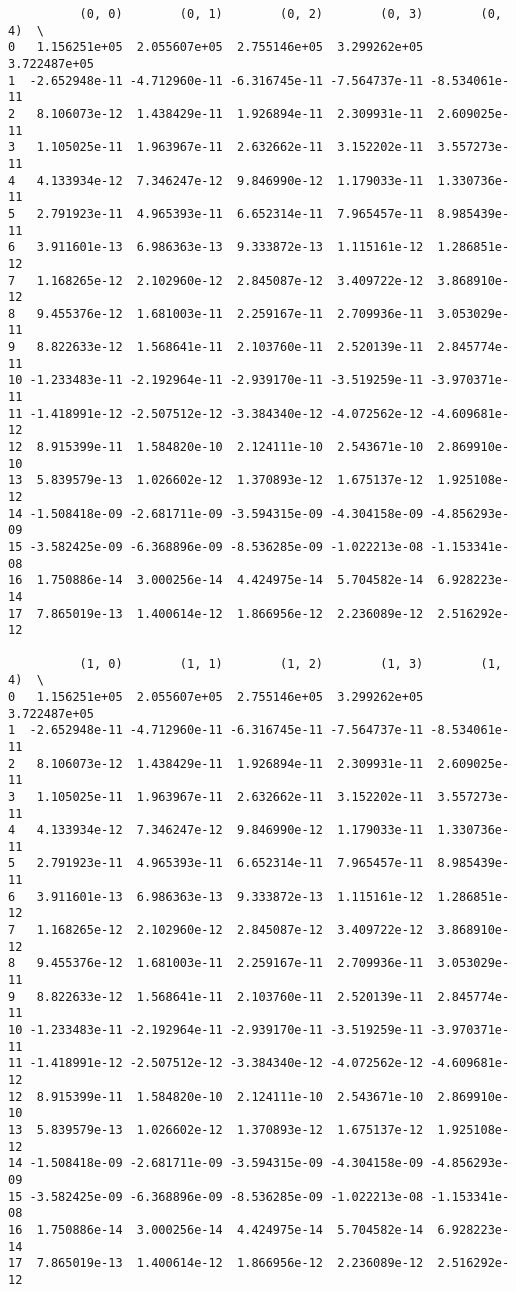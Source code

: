 \documentclass[11pt]{article}
\begin{document}
    
    \begin{verbatim}
          (0, 0)        (0, 1)        (0, 2)        (0, 3)        (0, 4)  \
0   1.156251e+05  2.055607e+05  2.755146e+05  3.299262e+05  3.722487e+05   
1  -2.652948e-11 -4.712960e-11 -6.316745e-11 -7.564737e-11 -8.534061e-11   
2   8.106073e-12  1.438429e-11  1.926894e-11  2.309931e-11  2.609025e-11   
3   1.105025e-11  1.963967e-11  2.632662e-11  3.152202e-11  3.557273e-11   
4   4.133934e-12  7.346247e-12  9.846990e-12  1.179033e-11  1.330736e-11   
5   2.791923e-11  4.965393e-11  6.652314e-11  7.965457e-11  8.985439e-11   
6   3.911601e-13  6.986363e-13  9.333872e-13  1.115161e-12  1.286851e-12   
7   1.168265e-12  2.102960e-12  2.845087e-12  3.409722e-12  3.868910e-12   
8   9.455376e-12  1.681003e-11  2.259167e-11  2.709936e-11  3.053029e-11   
9   8.822633e-12  1.568641e-11  2.103760e-11  2.520139e-11  2.845774e-11   
10 -1.233483e-11 -2.192964e-11 -2.939170e-11 -3.519259e-11 -3.970371e-11   
11 -1.418991e-12 -2.507512e-12 -3.384340e-12 -4.072562e-12 -4.609681e-12   
12  8.915399e-11  1.584820e-10  2.124111e-10  2.543671e-10  2.869910e-10   
13  5.839579e-13  1.026602e-12  1.370893e-12  1.675137e-12  1.925108e-12   
14 -1.508418e-09 -2.681711e-09 -3.594315e-09 -4.304158e-09 -4.856293e-09   
15 -3.582425e-09 -6.368896e-09 -8.536285e-09 -1.022213e-08 -1.153341e-08   
16  1.750886e-14  3.000256e-14  4.424975e-14  5.704582e-14  6.928223e-14   
17  7.865019e-13  1.400614e-12  1.866956e-12  2.236089e-12  2.516292e-12   

          (1, 0)        (1, 1)        (1, 2)        (1, 3)        (1, 4)  \
0   1.156251e+05  2.055607e+05  2.755146e+05  3.299262e+05  3.722487e+05   
1  -2.652948e-11 -4.712960e-11 -6.316745e-11 -7.564737e-11 -8.534061e-11   
2   8.106073e-12  1.438429e-11  1.926894e-11  2.309931e-11  2.609025e-11   
3   1.105025e-11  1.963967e-11  2.632662e-11  3.152202e-11  3.557273e-11   
4   4.133934e-12  7.346247e-12  9.846990e-12  1.179033e-11  1.330736e-11   
5   2.791923e-11  4.965393e-11  6.652314e-11  7.965457e-11  8.985439e-11   
6   3.911601e-13  6.986363e-13  9.333872e-13  1.115161e-12  1.286851e-12   
7   1.168265e-12  2.102960e-12  2.845087e-12  3.409722e-12  3.868910e-12   
8   9.455376e-12  1.681003e-11  2.259167e-11  2.709936e-11  3.053029e-11   
9   8.822633e-12  1.568641e-11  2.103760e-11  2.520139e-11  2.845774e-11   
10 -1.233483e-11 -2.192964e-11 -2.939170e-11 -3.519259e-11 -3.970371e-11   
11 -1.418991e-12 -2.507512e-12 -3.384340e-12 -4.072562e-12 -4.609681e-12   
12  8.915399e-11  1.584820e-10  2.124111e-10  2.543671e-10  2.869910e-10   
13  5.839579e-13  1.026602e-12  1.370893e-12  1.675137e-12  1.925108e-12   
14 -1.508418e-09 -2.681711e-09 -3.594315e-09 -4.304158e-09 -4.856293e-09   
15 -3.582425e-09 -6.368896e-09 -8.536285e-09 -1.022213e-08 -1.153341e-08   
16  1.750886e-14  3.000256e-14  4.424975e-14  5.704582e-14  6.928223e-14   
17  7.865019e-13  1.400614e-12  1.866956e-12  2.236089e-12  2.516292e-12   


\end{verbatim}
\end{document}
